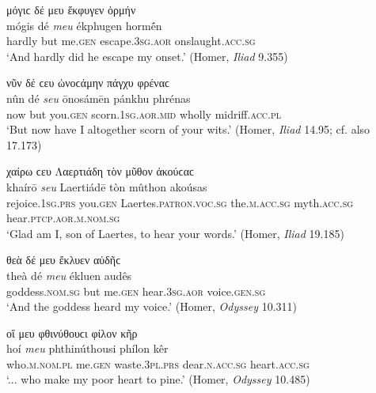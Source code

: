 \begin{exe}
\ex μόγιϲ δέ μευ ἔκφυγεν ὁρμήν\\
\gll mógis dé \emph{meu} ékphugen hormḗn\\
hardly but me.\textsc{gen} escape.\textsc{3sg.aor} onslaught.\textsc{acc.sg}\\
\trans `And hardly did he escape my onset.' (Homer, \textit{Iliad} 9.355)
\label{gensep11}
\end{exe}

\begin{exe}
\ex νῦν δέ ϲευ ὠνοϲάμην πάγχυ φρέναϲ\\
\gll nûn dé \emph{seu} ōnosámēn pánkhu phrénas\\
now but you.\textsc{gen} scorn.\textsc{1sg.aor.mid} wholly midriff.\textsc{acc.pl}\\
\trans `But now have I altogether scorn of your wits.' (Homer, \textit{Iliad} 14.95; cf. also 17.173)
\label{gensep12}
\end{exe}

\begin{exe}
\ex χαίρω ϲευ Λαερτιάδη τὸν μῦθον ἀκούϲαϲ\\
\gll khaírō \emph{seu} Laertiádē tòn mûthon akoúsas\\
rejoice.\textsc{1sg.prs} you.\textsc{gen} Laertes.\textsc{patron.voc.sg} the.\textsc{m.acc.sg} myth.\textsc{acc.sg} hear.\textsc{ptcp.aor.m.nom.sg}\\
\trans `Glad am I, son of Laertes, to hear your words.' (Homer, \textit{Iliad} 19.185)
\label{gensep13}
\end{exe}

\begin{exe}
\ex θεὰ δέ μευ ἔκλυεν αὐδῆϲ\\
\gll theà dé \emph{meu} ékluen audês\\
goddess.\textsc{nom.sg} but me.\textsc{gen} hear.\textsc{3sg.aor} voice.\textsc{gen.sg}\\
\trans `And the goddess heard my voice.' (Homer, \textit{Odyssey} 10.311)
\label{gensep14}
\end{exe}

\begin{exe}
\ex οἵ μευ φθινύθουϲι φίλον κῆρ\\
\gll hoí \emph{meu} phthinúthousi phílon kêr\\
who.\textsc{m.nom.pl} me.\textsc{gen} waste.\textsc{3pl.prs} dear.\textsc{n.acc.sg} heart.\textsc{acc.sg}\\
\trans `... who make my poor heart to pine.' (Homer, \textit{Odyssey} 10.485)
\label{gensep15}
\end{exe}

